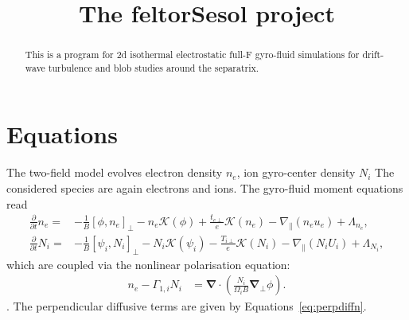 \documentclass{hitec} %
\renewcommand{\vec}[1]{\boldsymbol{#1}}
\begin{document}
\title{The feltorSesol project}
\maketitle

\begin{abstract}
This is a program for 2d isothermal electrostatic full-F gyro-fluid simulations for drift-wave turbulence and blob studies around the separatrix.
\end{abstract}

\section{Equations}
The two-field model evolves electron density 
\(n_e\), ion gyro-center density \(N_i\)
The considered species are again electrons and ions. The gyro-fluid moment equations read 
\begin{align}\label{eq:2Desolne}
\frac{\partial}{\partial t} n_e =&-
\frac{1}{B} \left[\phi,n_e \right]_{\perp} - n_e \mathcal{K}\left(\phi \right) + \frac{t_{e\perp}}{e} \mathcal{K}\left( n_e \right) 
-\nabla_\parallel \left(n_e u_e\right)
+  \Lambda_{n_e}  ,
\\
\label{eq:2DesolNi}
\frac{\partial}{\partial t} N_i =&
-\frac{1}{B} \left[\psi_i,N_i \right]_{\perp}- N_i \mathcal{K}\left(\psi_i \right) 
- \frac{T_{i\perp}}{e} \mathcal{K}\left( N_i \right) 
-\nabla_\parallel \left(N_i U_i\right)
+  \Lambda_{N_i}  ,
\end{align}
which are coupled via the nonlinear polarisation equation:
\begin{align}\label{eq:hwpol}
  n_e -\Gamma_{1,i} N_i &= \vec{\nabla} \cdot\left(\frac{N_i}{\Omega_i B} \vec{\nabla}_\perp \phi\right).
\end{align}.
The perpendicular diffusive terms are given by Equations~\eqref{eq:perpdiffn}.
\end{document}
